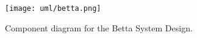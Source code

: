 \begin{figure}[h]
	\centering
	\texttt{[image: uml/betta.png]}
	\caption{Component diagram for the Betta System Design.}
	\label{fig:betta}
\end{figure}
